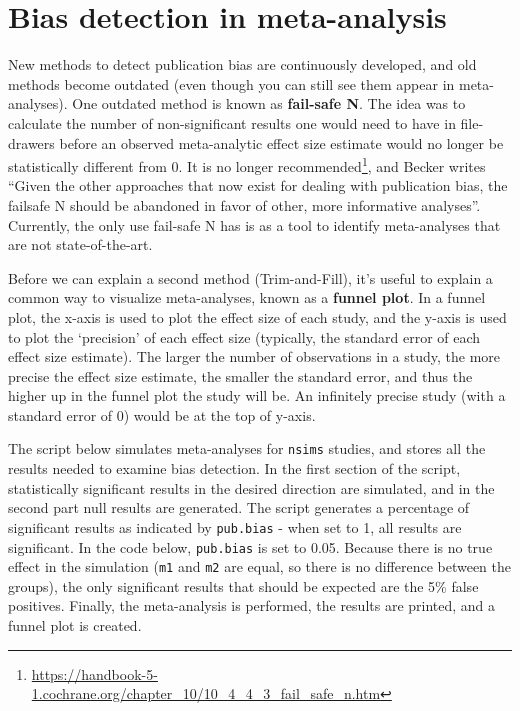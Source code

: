 \documentclass[
  oneside]{krantz}
\renewcommand{\href}[2]{#2\footnote{\url{#1}}}
\begin{document}
\hypertarget{bias-detection-in-meta-analysis}{%
\section{Bias detection in meta-analysis}\label{bias-detection-in-meta-analysis}}

New methods to detect publication bias are continuously developed, and old methods become outdated (even though you can still see them appear in meta-analyses). One outdated method is known as \textbf{fail-safe N}. The idea was to calculate the number of non-significant results one would need to have in file-drawers before an observed meta-analytic effect size estimate would no longer be statistically different from 0. It is \href{https://handbook-5-1.cochrane.org/chapter_10/10_4_4_3_fail_safe_n.htm}{no longer recommended}, and Becker \citeyearpar{becker_failsafe_2005} writes ``Given the other approaches that now exist for dealing with publication bias, the failsafe N should be abandoned in favor of other, more informative analyses''. Currently, the only use fail-safe N has is as a tool to identify meta-analyses that are not state-of-the-art.

Before we can explain a second method (Trim-and-Fill), it's useful to explain a common way to visualize meta-analyses, known as a \textbf{funnel plot}. In a funnel plot, the x-axis is used to plot the effect size of each study, and the y-axis is used to plot the `precision' of each effect size (typically, the standard error of each effect size estimate). The larger the number of observations in a study, the more precise the effect size estimate, the smaller the standard error, and thus the higher up in the funnel plot the study will be. An infinitely precise study (with a standard error of 0) would be at the top of y-axis.

The script below simulates meta-analyses for \texttt{nsims} studies, and stores all the results needed to examine bias detection. In the first section of the script, statistically significant results in the desired direction are simulated, and in the second part null results are generated. The script generates a percentage of significant results as indicated by \texttt{pub.bias} - when set to 1, all results are significant. In the code below, \texttt{pub.bias} is set to 0.05. Because there is no true effect in the simulation (\texttt{m1} and \texttt{m2} are equal, so there is no difference between the groups), the only significant results that should be expected are the 5\% false positives. Finally, the meta-analysis is performed, the results are printed, and a funnel plot is created.
\end{document}
